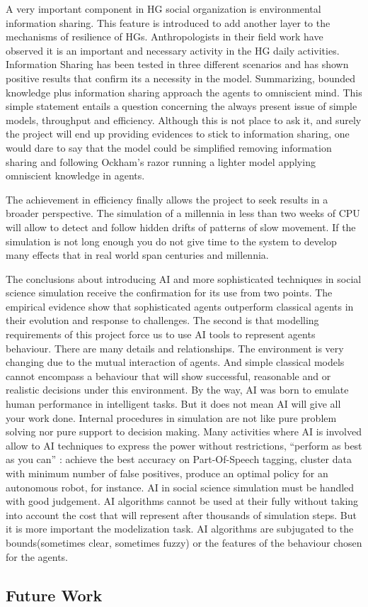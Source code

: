 \documentclass[11pt,oneside,a4paper,openright]{report}
\begin{document}
\begin{enumerate}
A very important component in HG social organization is environmental information sharing. This feature
is introduced to add another layer to the mechanisms of resilience of HGs. Anthropologists in their
field work have observed it is an important and necessary activity in the HG daily activities. 
Information Sharing has been tested in three different scenarios and has shown positive results that
confirm its a necessity in the model. Summarizing, bounded knowledge plus information sharing approach 
the agents to omniscient mind. This simple statement entails a question concerning the always present issue 
of simple models, throughput and efficiency. Although this is not place to ask it, and surely the project will end up providing evidences to stick to information sharing, one would dare to say that the model could be simplified
removing information sharing and following Ockham's razor running a lighter model applying omniscient
knowledge in agents.

The achievement in efficiency finally allows the project to seek results in a broader perspective. The 
simulation of a millennia in less than two weeks of CPU will allow to detect and follow hidden drifts of patterns
of slow movement. If the simulation is not long enough you do not give time to the system to develop many
effects that in real world span centuries and millennia.

The conclusions about introducing AI and more sophisticated techniques in social science simulation receive
the confirmation for its use from two points. The empirical evidence show that sophisticated agents outperform
classical agents in their evolution and response to challenges. The second is that modelling requirements of this 
project force us to use AI tools to represent agents behaviour. There are many details and relationships.
The environment is very changing due to the mutual interaction of agents. And simple classical models cannot 
encompass a behaviour that will show successful, reasonable and or realistic decisions under this environment.
By the way, AI was born to emulate human performance in intelligent tasks. But it does not mean AI will give all your work done. Internal procedures in simulation are not like pure problem solving nor pure support to decision making. Many activities where AI is involved allow to AI techniques to express the power without restrictions, ``perform as best as you can'' : achieve the best accuracy on Part-Of-Speech tagging, cluster data with minimum number of false positives, produce an optimal policy for an autonomous robot, for instance. AI in social science simulation must be handled with good judgement. AI algorithms cannot be used at their fully without taking into account the cost that will represent after thousands of simulation steps. But it is more important the modelization task. AI algorithms are subjugated to the bounds(sometimes clear, sometimes fuzzy) or the features of the behaviour chosen for the agents. 

\subsection{Future Work}

\end{enumerate}
\end{document}
